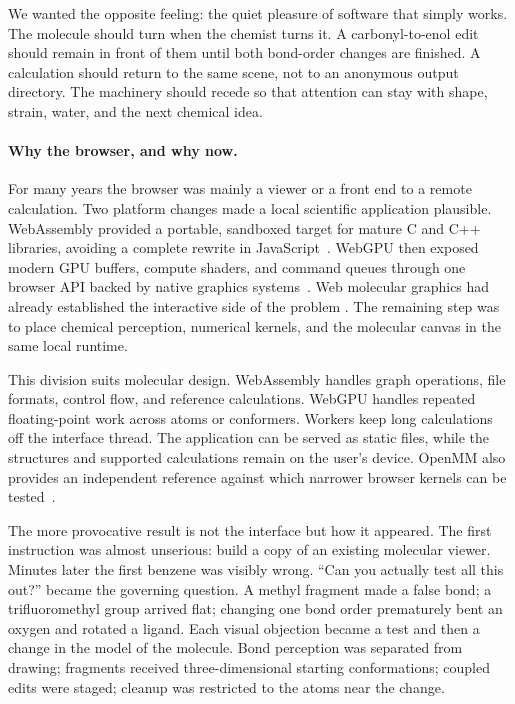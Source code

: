 \documentclass[10pt]{article}
\begin{document}
We wanted the opposite feeling: the quiet pleasure of software that simply
works. The molecule should turn when the chemist turns it. A carbonyl-to-enol
edit should remain in front of them until both bond-order changes are finished.
A calculation should return to the same scene, not to an anonymous output
directory. The machinery should recede so that attention can stay with shape,
strain, water, and the next chemical idea.

\paragraph{Why the browser, and why now.}
For many years the browser was mainly a viewer or a front end to a remote
calculation. Two platform changes made a local scientific application plausible.
WebAssembly provided a portable, sandboxed target for mature C and C++
libraries, avoiding a complete rewrite in JavaScript~\cite{webassembly}. WebGPU
then exposed modern GPU buffers, compute shaders, and command queues through one
browser API backed by native graphics systems~\cite{webgpu}. Web molecular
graphics had already established the interactive side of the problem
\cite{ngl}. The remaining step was to place chemical perception, numerical
kernels, and the molecular canvas in the same local runtime.

This division suits molecular design. WebAssembly handles graph operations,
file formats, control flow, and reference calculations. WebGPU handles repeated
floating-point work across atoms or conformers. Workers keep long calculations
off the interface thread. The application can be served as static files, while
the structures and supported calculations remain on the user's device. OpenMM
also provides an independent reference against which narrower browser kernels
can be tested~\cite{openmm8}.

The more provocative result is not the interface but how it appeared. The first
instruction was almost unserious: build a copy of an existing molecular viewer.
Minutes later the first benzene was visibly wrong. ``Can you actually test all
this out?'' became the governing question. A methyl fragment made a false bond;
a trifluoromethyl group arrived flat; changing one bond order prematurely bent
an oxygen and rotated a ligand. Each visual objection became a test and then a
change in the model of the molecule. Bond perception was separated from drawing;
fragments received three-dimensional starting conformations; coupled edits were
staged; cleanup was restricted to the atoms near the change.
\end{document}
